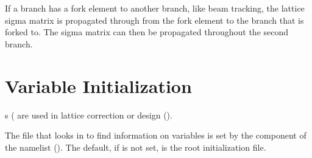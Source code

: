 {{{{{{{{{{{If a branch has a fork element to another branch, like beam tracking, the lattice sigma matrix is propagated through
from the fork element to the branch that is forked to. The sigma matrix can then be propagated throughout the second
branch.

\section{Variable Initialization}
\label{s:init.var} 

\tao {}s ( are used in lattice correction or design (). 

The file that \tao looks in to find information on \tao variables is set by the  component of
the  namelist (). The default, if  is not set, is
the root initialization file.

}}}}}}}}}}}
